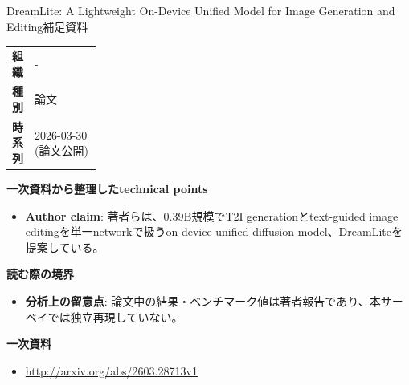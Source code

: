 \begin{technicalnote}{DreamLite: A Lightweight On-Device Unified Model for Image Generation and Editing}{補足資料}
\begingroup
\begin{tabularx}{\linewidth}{@{}>{\bfseries}p{0.22\linewidth}X@{}}
組織 & - \\
種別 & 論文 \\
時系列 & 2026-03-30 (論文公開) \\
\end{tabularx}
\smallskip
{\bfseries 一次資料から整理したtechnical points}
\begin{itemize}[leftmargin=1.5em,itemsep=0.35em]
\item \textbf{Author claim}: 著者らは、0.39B規模でT2I generationとtext-guided image editingを単一networkで扱うon-device unified diffusion model、DreamLiteを提案している。
\end{itemize}
\begin{minipage}{\linewidth}
{\bfseries 読む際の境界}
\begin{itemize}[leftmargin=1.5em,itemsep=0.35em]
\item \textbf{分析上の留意点}: 論文中の結果・ベンチマーク値は著者報告であり、本サーベイでは独立再現していない。
\end{itemize}
\begin{samepage}
{\bfseries 一次資料}
\begingroup\sloppy
\begin{itemize}[leftmargin=1.5em,itemsep=0.25em]
\item {\scriptsize\url{http://arxiv.org/abs/2603.28713v1}}
\end{itemize}
\endgroup
\end{samepage}
\end{minipage}
\endgroup
\end{technicalnote}
\medskip

